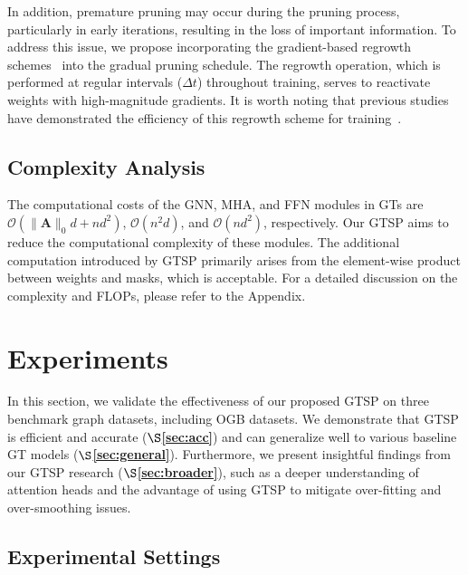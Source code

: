 \documentclass[letterpaper]{article} %
\begin{document}
In addition, premature pruning may occur during the pruning process, particularly in early iterations, resulting in the loss of important information. To address this issue, we propose incorporating the gradient-based regrowth schemes~\cite{growth-rigl} into the gradual pruning schedule. The regrowth operation, which is performed at regular intervals ($\Delta t$) throughout training, serves to reactivate weights with high-magnitude gradients. It is worth noting that previous studies have demonstrated the efficiency of this regrowth scheme for training~\cite{granet,cgp}.

\subsection{Complexity Analysis}

The computational costs of the GNN, MHA, and FFN modules in GTs are $\mathcal{O}\left(\|\boldsymbol{A}\|_0 d+ n d^2\right)$, $\mathcal{O}(n^{2}d)$, and $\mathcal{O}(nd^{2})$, respectively. Our GTSP aims to reduce the computational complexity of these modules. The additional computation introduced by GTSP primarily arises from the element-wise product between weights and masks, which is acceptable. For a detailed discussion on the complexity and FLOPs, please refer to the Appendix.




\section{Experiments}
\label{sec:experiment}

In this section, we validate the effectiveness of our proposed GTSP on three benchmark graph datasets, including OGB datasets. We demonstrate that GTSP is efficient and accurate (\textbf{$\S$\ref{sec:acc}}) and can generalize well to various baseline GT models  (\textbf{$\S$\ref{sec:general}}). Furthermore, we present insightful findings from our GTSP research (\textbf{$\S$\ref{sec:broader}}), such as a deeper understanding of attention heads and the advantage of using GTSP to mitigate over-fitting and over-smoothing issues.

\subsection{Experimental Settings}
\end{document}
